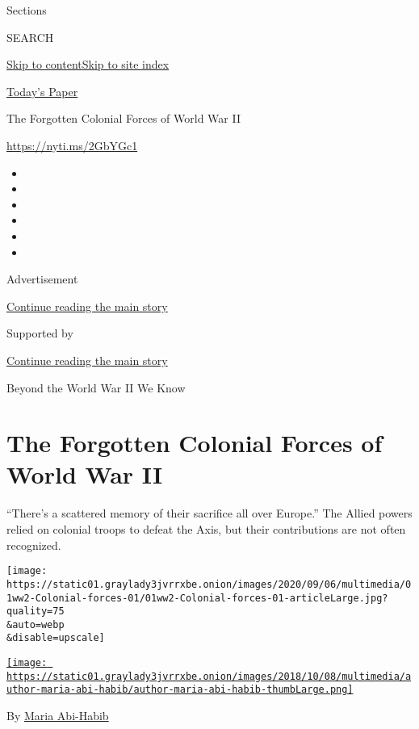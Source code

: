 Sections

SEARCH

\protect\hyperlink{site-content}{Skip to
content}\protect\hyperlink{site-index}{Skip to site index}

\href{https://myaccount.nytimes3xbfgragh.onion/auth/login?response_type=cookie\&client_id=vi}{}

\href{https://www.nytimes3xbfgragh.onion/section/todayspaper}{Today's
Paper}

The Forgotten Colonial Forces of World War II

\url{https://nyti.ms/2GbYGc1}

\begin{itemize}
\item
\item
\item
\item
\item
\item
\end{itemize}

Advertisement

\protect\hyperlink{after-top}{Continue reading the main story}

Supported by

\protect\hyperlink{after-sponsor}{Continue reading the main story}

Beyond the World War II We Know

\hypertarget{the-forgotten-colonial-forces-of-world-war-ii}{%
\section{The Forgotten Colonial Forces of World War
II}\label{the-forgotten-colonial-forces-of-world-war-ii}}

``There's a scattered memory of their sacrifice all over Europe.'' The
Allied powers relied on colonial troops to defeat the Axis, but their
contributions are not often recognized.

\texttt{[image: https://static01.graylady3jvrrxbe.onion/images/2020/09/06/multimedia/01ww2-Colonial-forces-01/01ww2-Colonial-forces-01-articleLarge.jpg?quality=75\\\&auto=webp\\\&disable=upscale]}

\href{https://www.nytimes3xbfgragh.onion/by/maria-abi-habib}{\texttt{[image: https://static01.graylady3jvrrxbe.onion/images/2018/10/08/multimedia/author-maria-abi-habib/author-maria-abi-habib-thumbLarge.png]}}

By \href{https://www.nytimes3xbfgragh.onion/by/maria-abi-habib}{Maria
Abi-Habib}

